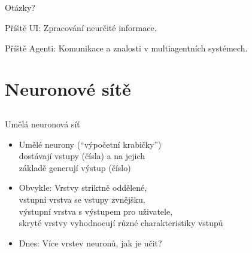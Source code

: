 \documentclass{beamer}
\begin{document}
\subsection{}
\begin{frame}{Otázky?}
\begin{center}
Příště UI: Zpracování neurčité informace.

Příště Agenti: Komunikace a znalosti v multiagentních systémech.
\end{center}
\end{frame}

\section{Neuronové sítě}

\subsection{}
\begin{frame}{Umělá neuronová síť}
\begin{itemize}
\item Umělé neurony (``výpočetní krabičky'') \\ dostávají vstupy (čísla) a na jejich \\ základě generují výstup (číslo)
\item Obvykle: Vrstvy striktně oddělené, \\ vstupní vrstva se vstupy zvnějšku, \\ výstupní vrstva s výstupem pro uživatele, \\ skryté vrstvy vyhodnocují různé charakteristiky vstupů
\item Dnes: Více vrstev neuronů, jak je učit?
\end{itemize}
\end{frame}
\end{document}
